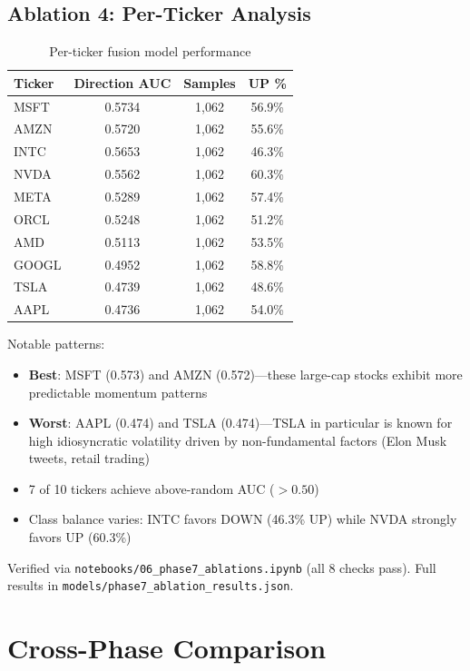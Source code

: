 \documentclass[12pt,a4paper]{article}
\begin{document}
\subsection{Ablation 4: Per-Ticker Analysis}

\begin{table}[H]
\centering
\begin{tabular}{lccc}
\toprule
\textbf{Ticker} & \textbf{Direction AUC} & \textbf{Samples} & \textbf{UP \%} \\
\midrule
MSFT & 0.5734 & 1,062 & 56.9\% \\
AMZN & 0.5720 & 1,062 & 55.6\% \\
INTC & 0.5653 & 1,062 & 46.3\% \\
NVDA & 0.5562 & 1,062 & 60.3\% \\
META & 0.5289 & 1,062 & 57.4\% \\
ORCL & 0.5248 & 1,062 & 51.2\% \\
AMD & 0.5113 & 1,062 & 53.5\% \\
GOOGL & 0.4952 & 1,062 & 58.8\% \\
TSLA & 0.4739 & 1,062 & 48.6\% \\
AAPL & 0.4736 & 1,062 & 54.0\% \\
\bottomrule
\end{tabular}
\caption{Per-ticker fusion model performance}
\label{tab:per_ticker}
\end{table}

\noindent Notable patterns:
\begin{itemize}[noitemsep]
    \item \textbf{Best}: MSFT (0.573) and AMZN (0.572)---these large-cap stocks exhibit more predictable momentum patterns
    \item \textbf{Worst}: AAPL (0.474) and TSLA (0.474)---TSLA in particular is known for high idiosyncratic volatility driven by non-fundamental factors (Elon Musk tweets, retail trading)
    \item 7 of 10 tickers achieve above-random AUC ($> 0.50$)
    \item Class balance varies: INTC favors DOWN (46.3\% UP) while NVDA strongly favors UP (60.3\%)
\end{itemize}

\noindent Verified via \texttt{notebooks/06\_phase7\_ablations.ipynb} (all 8 checks pass). Full results in \texttt{models/phase7\_ablation\_results.json}.

\section{Cross-Phase Comparison}
\label{sec:comparison}
\end{document}
